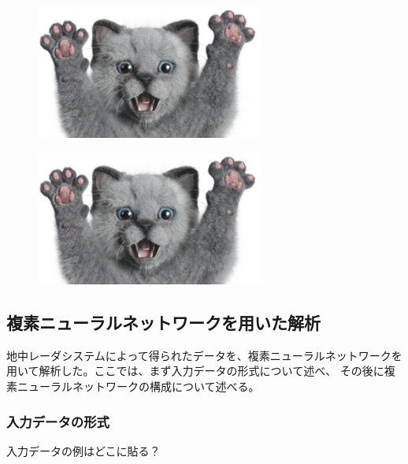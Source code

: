 \documentclass[11pt,a4paper,uplatex]{ujarticle}
\begin{document}
  \begin{figure}[tbp]
    \begin{minipage}[b]{0.495\textwidth}
      \centering
      \includegraphics[keepaspectratio, width=75mm]{Images/sampleneko.png}
      \label{fig:center_offset}
    \end{minipage}
    \begin{minipage}[b]{0.495\textwidth}
      \centering
      \includegraphics[keepaspectratio, width=75mm]{Images/sampleneko.png}
      \label{fig:actual_msr_range}
    \end{minipage}
  \end{figure}


  \subsection{複素ニューラルネットワークを用いた解析}\label{sec:analysis}
  地中レーダシステムによって得られたデータを、複素ニューラルネットワークを用いて解析した。ここでは、まず入力データの形式について述べ、
  その後に複素ニューラルネットワークの構成について述べる。
  \subsubsection{入力データの形式}
  入力データの例はどこに貼る？
\end{document}
